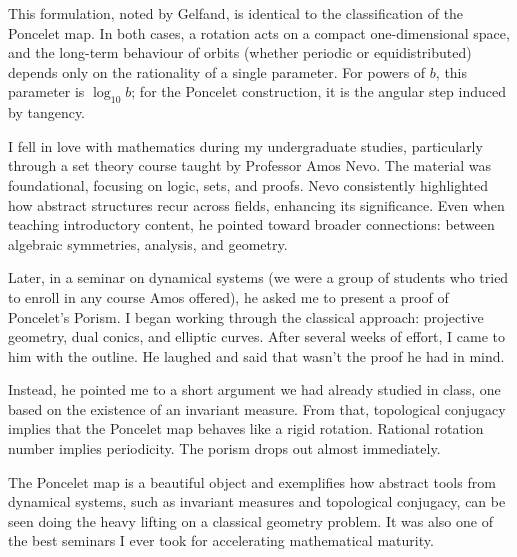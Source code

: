 This formulation, noted by Gelfand, is identical to the classification of the Poncelet map. In both cases, a rotation acts on a compact one-dimensional space, and the long-term behaviour of orbits (whether periodic or equidistributed) depends only on the rationality of a single parameter. For powers of $b$, this parameter is $\log_{10} b$; for the Poncelet construction, it is the angular step induced by tangency. 
\newpage
\begin{commentary}
I fell in love with mathematics during my undergraduate studies, particularly through a set theory course taught by Professor Amos Nevo. The material was foundational, focusing on logic, sets, and proofs. Nevo consistently highlighted how abstract structures recur across fields, enhancing its significance. Even when teaching introductory content, he pointed toward broader connections: between algebraic symmetries, analysis, and geometry.

Later, in a seminar on dynamical systems (we were a group of students who tried to enroll in any course Amos offered), he asked me to present a proof of Poncelet’s Porism. I began working through the classical approach: projective geometry, dual conics, and elliptic curves. After several weeks of effort, I came to him with the outline. He laughed and said that wasn’t the proof he had in mind.

Instead, he pointed me to a short argument we had already studied in class, one based on the existence of an invariant measure. From that, topological conjugacy implies that the Poncelet map behaves like a rigid rotation. Rational rotation number implies periodicity. The porism drops out almost immediately.

The Poncelet map is a beautiful object and exemplifies how abstract tools from dynamical systems, such as invariant measures and topological conjugacy, can be seen doing the heavy lifting on a classical geometry problem. It was also one of the best seminars I ever took for accelerating mathematical maturity.
\end{commentary}



